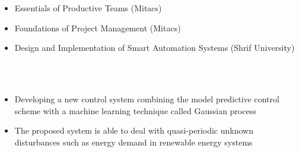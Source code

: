 \documentclass[10pt,letterpaper,ragged2e,compact]{mocv}
\begin{document}
\begin{paracol}{2}
    \begin{itemize}
        \item Essentials of Productive Teams (Mitacs)
        \item Foundations of Project Management (Mitacs)
        \item Design and Implementation of Smart Automation Systems (Shrif University)
    \end{itemize}
    \divider \\ 
    \divider \\
    \begin{itemize}
        \item Developing a new control system combining the model predictive control scheme with a machine learning technique called Gaussian process
        \item The proposed system is able to deal with quasi-periodic unknown disturbances such as energy demand in renewable energy systems

\end{itemize}
\end{paracol}
\end{document}
